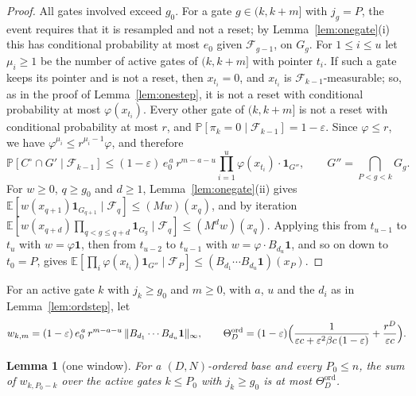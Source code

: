 \documentclass[11pt]{amsart}
\newtheorem{lemma}[theorem]{Lemma}
\theoremstyle{definition}
\theoremstyle{remark}
\newcommand{\eps}{\varepsilon}
\newcommand{\PP}{\mathbb{P}}
\newcommand{\EE}{\mathbb{E}}
\newcommand{\cF}{\mathcal{F}}
\begin{document}
\begin{proof}
All gates involved exceed $g_0$. For a gate $g\in(k,k+m]$ with $j_g=P$, the event requires that
it is resampled and not a reset; by Lemma~\ref{lem:onegate}(i) this has conditional probability
at most $e_0$ given $\cF_{g-1}$, on $G_g$. For $1\le i\le u$ let $\mu_i\ge1$ be the number of
active gates of $(k,k+m]$ with pointer $t_i$. If such a gate keeps its pointer and is not a
reset, then $x_{t_i}=0$, and $x_{t_i}$ is $\cF_{k-1}$-measurable; so, as in the proof of
Lemma~\ref{lem:onestep}, it is not a reset with conditional probability at most
$\varphi(x_{t_i})$. Every other gate of $(k,k+m]$ is not a reset with conditional probability at
most $r$, and $\PP[\pi_k=0\mid\cF_{k-1}]=1-\eps$. Since $\varphi\le r$, we have
$\varphi^{\mu_i}\le r^{\mu_i-1}\varphi$, and therefore
\[
\PP[C^{\circ}\cap G'\mid\cF_{k-1}]\le(1-\eps)\,e_0^{\,a}\,r^{m-a-u}\prod_{i=1}^{u}\varphi(x_{t_i})\cdot\mathbf 1_{G''},
\qquad G''=\bigcap_{P<g<k}G_g .
\]
For $w\ge0$, $q\ge g_0$ and $d\ge1$, Lemma~\ref{lem:onegate}(ii) gives
$\EE[w(x_{q+1})\mathbf 1_{G_{q+1}}\mid\cF_q]\le(Mw)(x_q)$, and by iteration
$\EE[w(x_{q+d})\prod_{q<g\le q+d}\mathbf 1_{G_g}\mid\cF_q]\le(M^dw)(x_q)$. Applying this from
$t_{u-1}$ to $t_u$ with $w=\varphi\mathbf 1$, then from $t_{u-2}$ to $t_{u-1}$ with
$w=\varphi\cdot B_{d_u}\mathbf 1$, and so on down to $t_0=P$, gives
$\EE[\prod_i\varphi(x_{t_i})\mathbf 1_{G''}\mid\cF_P]\le(B_{d_1}\cdots B_{d_u}\mathbf 1)(x_P)$.
\end{proof}

For an active gate $k$ with $j_k\ge g_0$ and $m\ge0$, with $a$, $u$ and the $d_i$ as in
Lemma~\ref{lem:ordstep}, let
\[
w_{k,m}=(1-\eps)\,e_0^{\,a}\,r^{m-a-u}\,\|B_{d_1}\cdots B_{d_u}\mathbf 1\|_\infty,
\qquad
\Theta^{\mathrm{ord}}_D=(1-\eps)\Bigl(\frac1{\eps c+\eps^2\beta c\,(1-\eps)}+\frac{r^D}{\eps c}\Bigr).
\]

\begin{lemma}[one window]\label{lem:ordsum}
For a $(D,N)$-ordered base and every $P_0\le n$, the sum of $w_{k,P_0-k}$ over the active gates
$k\le P_0$ with $j_k\ge g_0$ is at most $\Theta^{\mathrm{ord}}_D$.
\end{lemma}
\end{document}
